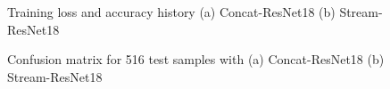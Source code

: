 \documentclass[10pt,twocolumn,letterpaper]{article}
\begin{document}

\begin{figure}[t]
\begin{center}
\end{center}
   \caption{Training loss and accuracy history (a) Concat-ResNet18 (b) Stream-ResNet18}
\label{concat-loss}
\end{figure}

\begin{figure}[t]
\begin{center}
\end{center}
   \caption{Confusion matrix for 516 test samples with (a) Concat-ResNet18 (b) Stream-ResNet18}
\label{concat-heatmap}
\end{figure}



\end{document}
